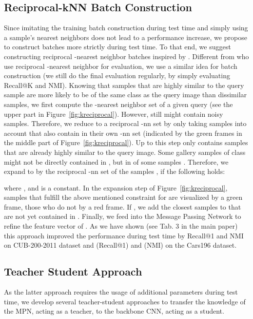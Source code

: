 \documentclass{article}
\begin{document}
\subsection{Reciprocal-kNN Batch Construction}
Since imitating the training batch construction during test time and simply using a sample's  nearest neighbors does not lead to a performance increase, we propose to construct batches more strictly during test time. 
To that end, we suggest constructing reciprocal -nearest neighbor batches inspired by \cite{DBLP:conf/cvpr/ZhongZCL17}. Different from \cite{DBLP:conf/cvpr/ZhongZCL17} who use reciprocal -nearest neighbor for evaluation, we use a similar idea for batch construction (we still do the final evaluation regularly, by simply evaluating Recall@K and NMI).
Knowing that samples that are highly similar to the query sample are more likely to be of the same class as the query image  than dissimilar samples, we first compute the -nearest neighbor set  of a given query  (see the upper part in Figure~\ref{fig:kreciprocal}). 
However,  still might contain noisy samples. Therefore, we reduce  to a reciprocal -nn set  by only taking samples  into account that also contain  in their own -nn set  (indicated by the green frames in the middle part of Figure~\ref{fig:kreciprocal}). 
Up to this step  only contains samples that are already highly similar to the query image. Some gallery samples  of class  might not be directly contained in , but in  of some samples . Therefore, we expand  to  by the reciprocal -nn set  of the samples , if the following holds:



where ,  and  is a constant. In the expansion step of Figure~\ref{fig:kreciprocal}, samples that fulfill the above mentioned constraint for  are visualized by a green frame, those who do not by a red frame. 
If , we add the closest samples to  that are not yet contained in . Finally, we feed  into the Message Passing Network to refine the feature vector of . As we have shown (see Tab. 3 in the main paper) this approach improved the performance during test time by  Recall@1 and  NMI on CUB-200-2011 dataset and  (Recall@1) and  (NMI) on the Cars196 dataset.

\subsection{Teacher Student Approach}
As the latter approach requires the usage of additional parameters during test time, we develop several teacher-student approaches to transfer the knowledge of the MPN, acting as a teacher, to the backbone CNN, acting as a student. 
\end{document}
